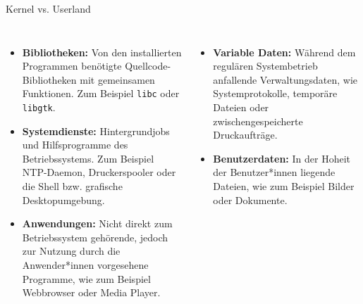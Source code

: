 {
\scriptsize
\setlength{\leftmargini}{1.2em}

\begin{frame}{Kernel vs. Userland}

    {
        \tiny

        \begin{columns}[T,onlytextwidth]
            \begin{itemize}
                \justifying

                \item \textbf{Bibliotheken:} Von den installierten Programmen
                benötigte Quellcode-Bibliotheken mit gemeinsamen Funktionen.
                Zum Beispiel \texttt{libc} oder \texttt{libgtk}.

                \item \textbf{Systemdienste:} Hintergrundjobs und Hilfsprogramme des
                Betriebssystems. Zum Beispiel NTP-Daemon, Druckerspooler oder die
                Shell bzw. grafische Desktopumgebung.

                \item \textbf{Anwendungen:} Nicht direkt zum Betriebssystem gehörende,
                jedoch zur Nutzung durch die Anwender*innen vorgesehene Programme, wie
                zum Beispiel Webbrowser oder Media Player.
            \end{itemize}

            \begin{itemize}
                \justifying

                \item \textbf{Variable Daten:} Während dem regulären Systembetrieb
                anfallende Verwaltungsdaten, wie Systemprotokolle, temporäre Dateien
                oder zwischengespeicherte Druckaufträge.

                \item \textbf{Benutzerdaten:} In der Hoheit der Benutzer*innen liegende
                Dateien, wie zum Beispiel Bilder oder Dokumente.
            \end{itemize}
        \end{columns}
    }


\end{frame}}
